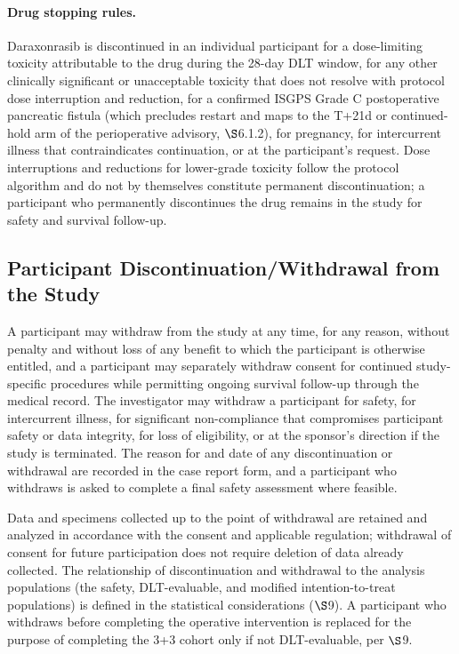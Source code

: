 \paragraph{Drug stopping rules.}
Daraxonrasib is discontinued in an individual participant for a dose-limiting
toxicity attributable to the drug during the 28-day DLT window, for any other
clinically significant or unacceptable toxicity that does not resolve with protocol
dose interruption and reduction, for a confirmed ISGPS Grade C postoperative
pancreatic fistula \cite{Bassi2017} (which precludes restart and maps to the T+21d
or continued-hold arm of the perioperative advisory, $\S$6.1.2), for pregnancy, for
intercurrent illness that contraindicates continuation, or at the participant's
request. Dose interruptions and reductions for lower-grade toxicity follow the
protocol algorithm and do not by themselves constitute permanent discontinuation;
a participant who permanently discontinues the drug remains in the study for safety
and survival follow-up.

\subsection{Participant Discontinuation/Withdrawal from the Study}

A participant may withdraw from the study at any time, for any reason, without
penalty and without loss of any benefit to which the participant is otherwise
entitled, and a participant may separately withdraw consent for continued
study-specific procedures while permitting ongoing survival follow-up through the
medical record. The investigator may withdraw a participant for safety, for
intercurrent illness, for significant non-compliance that compromises participant
safety or data integrity, for loss of eligibility, or at the sponsor's direction if
the study is terminated. The reason for and date of any discontinuation or
withdrawal are recorded in the case report form, and a participant who withdraws is
asked to complete a final safety assessment where feasible.

Data and specimens collected up to the point of withdrawal are retained and analyzed
in accordance with the consent and applicable regulation; withdrawal of consent for
future participation does not require deletion of data already collected. The
relationship of discontinuation and withdrawal to the analysis populations (the
safety, DLT-evaluable, and modified intention-to-treat populations) is defined in
the statistical considerations ($\S$9). A participant who withdraws before
completing the operative intervention is replaced for the purpose of completing the
3+3 cohort only if not DLT-evaluable, per $\S$9.


